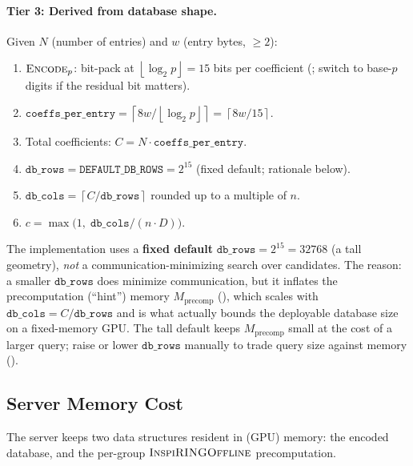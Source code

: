 \documentclass[11pt,a4paper]{article}
\newcommand{\floor}[1]{\left\lfloor #1 \right\rfloor}
\newcommand{\ceil}[1]{\left\lceil #1 \right\rceil}
\begin{document}
\paragraph{Tier 3: Derived from database shape.}
Given $N$ (number of entries) and $w$ (entry bytes, $\ge 2$):
\begin{enumerate}[nosep]
    \item $\textsc{Encode}_p$: bit-pack at $\floor{\log_2 p} = 15$ bits per coefficient (; switch to base-$p$ digits if the residual bit matters).
    \item $\texttt{coeffs\_per\_entry} = \ceil{8w / \floor{\log_2 p}} = \ceil{8w / 15}$.
    \item Total coefficients: $C = N \cdot \texttt{coeffs\_per\_entry}$.
    \item $\texttt{db\_rows} = \texttt{DEFAULT\_DB\_ROWS} = 2^{15}$ (fixed default; rationale below).
    \item $\texttt{db\_cols} = \ceil{C / \texttt{db\_rows}}$ rounded up to a multiple of $n$.
    \item $c = \max\bigl(1,\; \texttt{db\_cols} / (n \cdot D)\bigr)$.
\end{enumerate}
The implementation uses a \textbf{fixed default} $\texttt{db\_rows} = 2^{15} = 32768$ (a tall geometry), \emph{not} a communication-minimizing search over candidates.
The reason: a smaller $\texttt{db\_rows}$ does minimize communication, but it inflates the precomputation (``hint'') memory $M_{\mathrm{precomp}}$ (), which scales with $\texttt{db\_cols} = C/\texttt{db\_rows}$ and is what actually bounds the deployable database size on a fixed-memory GPU.
The tall default keeps $M_{\mathrm{precomp}}$ small at the cost of a larger query; raise or lower $\texttt{db\_rows}$ manually to trade query size against memory ().

\subsection{Server Memory Cost}\label{sec:server-memory}

The server keeps two data structures resident in (GPU) memory: the encoded database, and the per-group $\textsc{InspiRINGOffline}$ precomputation.
\end{document}
